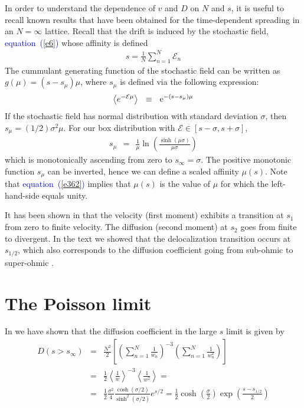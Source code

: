 \documentclass[aps,pre,floats,floatfix,twocolumn]{revtex4}
\newcommand{\eexp}[1]{\mathrm{e}^{#1}}
\newcommand{\be}[1]{\begin{eqnarray}\ifthenelse{#1=-1}{\nonumber}{\ifthenelse{#1=0}{}{\label{e#1}}}}
\newcommand{\beq}{\begin{eqnarray}}
\newcommand{\eeq}{\end{eqnarray}}
\newcommand{\Eq}[1]{\textcolor{blue}{{equation}\!~(\ref{#1})}}
\begin{document}
In order to understand the dependence of $v$ and $D$ on $N$ and $s$, 
it is useful to recall known results that have been obtained 
for the time-dependent spreading in an $N=\infty$ lattice.
Recall that the drift is induced by the stochastic field, \Eq{e6}
whose affinity is defined
%
\beq
s = \frac{1}{N}\sum_{n=1}^N \mathcal{E}_{n}
\eeq
%
The cummulant generating function of the stochastic field 
can be written as $g(\mu)=(s-s_{\mu})\mu$, where $s_{\mu}$ 
is defined via the following expression:   
%
\be{362}
\left\langle  e^{-\mathcal{E}\mu}\right\rangle \ \ \equiv \ \ \eexp{-(s-s_{\mu})\mu} 
\eeq
%  
If the stochastic field has normal distribution 
with standard deviation $\sigma$, then ${s_{\mu}=(1/2) \sigma^2 \mu}$.
For our box distribution with $\mathcal{E} \in [s-\sigma,s+\sigma]$,
%
\beq
s_{\mu}  \ \ = \ \ \frac{1}{\mu} \ln\left( \frac{\sinh (\mu \sigma)}{\mu \sigma} \right)
\eeq
%
which is monotonically ascending from zero to $s_{\infty} = \sigma$. 
The positive monotonic function $s_{\mu}$ can be inverted,
hence we can define a scaled affinity $\mu(s)$.
Note that \Eq{e362} implies that $\mu(s)$ is the value 
of $\mu$ for which the left-hand-side equals unity. 
%

It has been shown in \cite{odh1} that the velocity (first moment) exhibits a transition at $s_1$ from zero to finite velocity. 
The diffusion (second moment) at $s_2$ goes from finite to divergent.
In the text we showed that the delocalization transition occurs at $s_{1/2}$, 
which also corresponds to the diffusion coefficient going from sub-ohmic to super-ohmic \cite{nes}.


\section{The Poisson limit}
\label{A11}

In \cite{nes} we have shown that the diffusion coefficient in the large $s$ limit is given by
%
\beq
D(s>s_{\infty}) &=&  \frac{N^2}{2} \left[\left( \sum_{n=1}^N \frac{1}{w_n} \right)^{-3} \left(\sum_{n=1}^N \frac{1}{w_n ^2}\right)\right] \\
&=& \frac{1}{2} \left\langle \frac{1}{w}\right\rangle ^{-3}   \left\langle \frac{1}{w^2}\right\rangle = \\
&=&  \frac{1}{2}\frac{\sigma^2}{4} \frac{\cosh(\sigma/2)}{\sinh^2(\sigma/2)}e^{s/2} = \frac{1}{2}\cosh\left(\frac{\sigma}{2}\right) \exp\left(\frac{s-s_{1/2}}{2}\right)
\eeq
\end{document}
